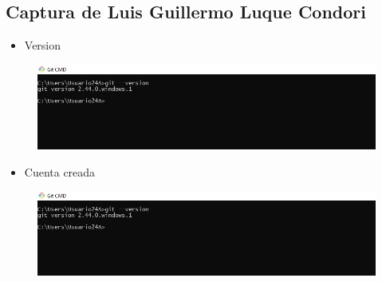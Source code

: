 \documentclass{article}
\begin{document}
	\subsection{Captura de Luis Guillermo Luque Condori}
	\begin{itemize}
		\item Version
	\end{itemize}
	\begin{figure}[H]
		\centering
		\includegraphics[width=1.0\textwidth,keepaspectratio]{img/LuisVersion.jpg}
	\end{figure}
	\begin{itemize}
		\item Cuenta creada
	\end{itemize}
	\begin{figure}[H]
		\centering
		\includegraphics[width=1.0\textwidth,keepaspectratio]{img/LuisVersion.jpg}
	\end{figure}
	\clearpage
\end{document}
